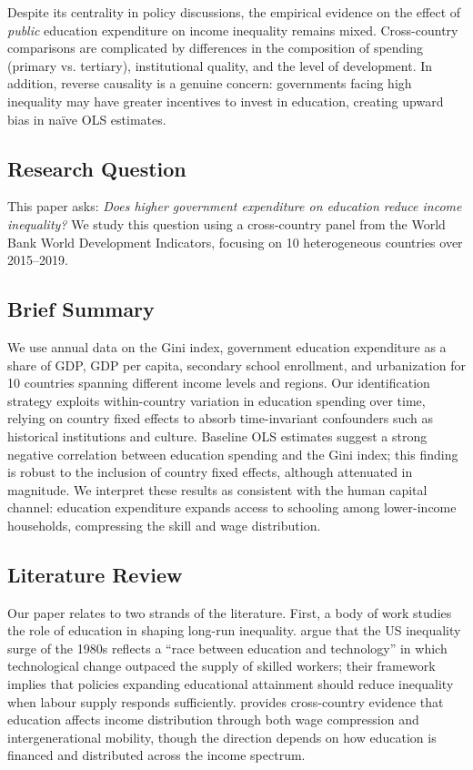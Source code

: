 \documentclass[12pt,a4paper]{article}
\begin{document}
Despite its centrality in policy discussions, the empirical evidence on the effect of
\textit{public} education expenditure on income inequality remains mixed. Cross-country
comparisons are complicated by differences in the composition of spending (primary vs.
tertiary), institutional quality, and the level of development. In addition, reverse
causality is a genuine concern: governments facing high inequality may have greater
incentives to invest in education, creating upward bias in naïve OLS estimates.

\subsection*{Research Question}

This paper asks: \textit{Does higher government expenditure on education reduce income
inequality?} We study this question using a cross-country panel from the World Bank
World Development Indicators, focusing on 10 heterogeneous countries over 2015--2019.

\subsection*{Brief Summary}

We use annual data on the Gini index, government education expenditure as a share of
GDP, GDP per capita, secondary school enrollment, and urbanization for 10 countries
spanning different income levels and regions. Our identification strategy exploits
within-country variation in education spending over time, relying on country fixed
effects to absorb time-invariant confounders such as historical institutions and
culture. Baseline OLS estimates suggest a strong negative correlation between education
spending and the Gini index; this finding is robust to the inclusion of country fixed
effects, although attenuated in magnitude. We interpret these results as consistent
with the human capital channel: education expenditure expands access to schooling among
lower-income households, compressing the skill and wage distribution.

\subsection*{Literature Review}

Our paper relates to two strands of the literature. First, a body of work studies the
role of education in shaping long-run inequality. \citet{goldin2008race} argue that
the US inequality surge of the 1980s reflects a ``race between education and technology''
in which technological change outpaced the supply of skilled workers; their framework
implies that policies expanding educational attainment should reduce inequality when
labour supply responds sufficiently. \citet{checchi2003education} provides cross-country
evidence that education affects income distribution through both wage compression and
intergenerational mobility, though the direction depends on how education is financed
and distributed across the income spectrum.
\end{document}

